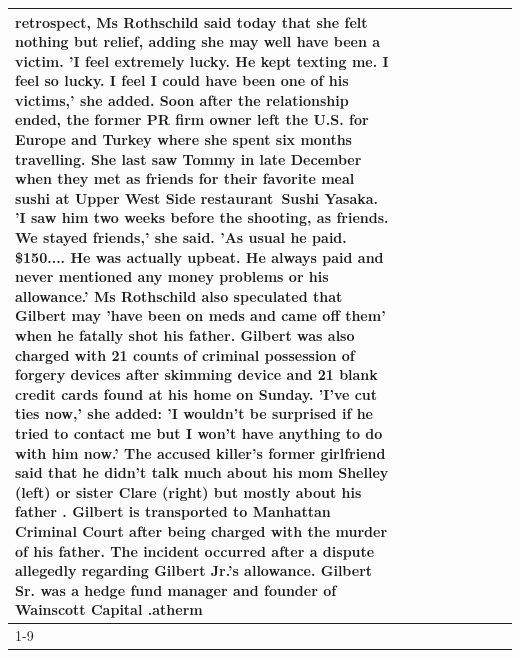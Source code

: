 \begin{table}[H]
\begin{tabular}{lllrlllll}
retrospect, Ms Rothschild said today that she felt nothing but relief, adding she may well have been a victim. 'I feel extremely lucky. He kept texting me. I feel so lucky. I feel I could have been one of his victims,' she added. Soon after the relationship ended, the former PR firm owner left the U.S. for Europe and Turkey where she spent six months  travelling. She last saw Tommy in late December when they met as friends for their favorite meal sushi at Upper West Side restaurant Sushi Yasaka. 'I saw him two weeks before the shooting, as friends. We stayed friends,' she said. 'As usual he paid. \$150.... He was actually upbeat. He always paid and never mentioned any money problems or his allowance.' Ms Rothschild also speculated that Gilbert may 'have been on meds and came off them' when he fatally shot his father. Gilbert was also charged with 21 counts of criminal possession of forgery devices after skimming device and 21 blank credit cards found at his home on Sunday. 'I've cut ties now,' she added: 'I wouldn’t be surprised if he tried to contact me but I won’t have anything to do with him now.' The accused killer's former girlfriend said that he didn't talk much about his mom Shelley (left) or sister Clare (right) but mostly about his father . Gilbert is transported to Manhattan Criminal Court  after being charged with the murder of his father. The incident occurred after a dispute allegedly regarding Gilbert Jr.'s allowance. Gilbert Sr. was a hedge fund manager and founder of Wainscott Capital .atherm \\
\cline{1-9}

\end{tabular}
\end{table}
